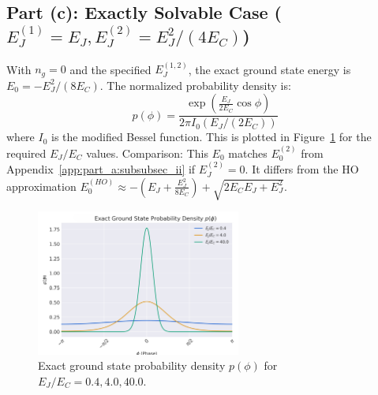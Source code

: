 \documentclass[12pt]{article}
\begin{document}
\begin{appendices}
\subsection[Part (c): Exactly Solvable Case]{Part (c): Exactly Solvable Case ($E_J^{(1)}=E_J, E_J^{(2)}=E_J^2/(4E_C)$)}
\label{app:part_c}

With $n_g = 0$ and the specified $E_J^{(1,2)}$, the exact ground state energy is $E_0 = -E_J^2 / (8 E_C)$. The normalized probability density is:
\begin{equation}
p(\phi) = \frac{\exp(\frac{E_J}{2 E_C} \cos \phi)}{2 \pi I_0(E_J / (2 E_C))}
\end{equation}
where $I_0$ is the modified Bessel function. This is plotted in Figure~\ref{fig:app_exact_prob} for the required $E_J/E_C$ values.
Comparison: This $E_0$ matches $E_0^{(2)}$ from Appendix~\ref{app:part_a:subsubsec_ii} if $E_J^{(2)}=0$. It differs from the HO approximation $E_0^{(HO)} \approx -(E_J + \frac{E_J^2}{8 E_C}) + \sqrt{2 E_C E_J + E_J^2}$.

\begin{figure}[htbp]
    \centering
    \includegraphics[width=0.6\textwidth]{fig_exact_prob.png}
    \caption{Exact ground state probability density $p(\phi)$ for $E_J/E_C = 0.4, 4.0, 40.0$.}
    \label{fig:app_exact_prob}
\end{figure}

\end{appendices}
\end{document}
